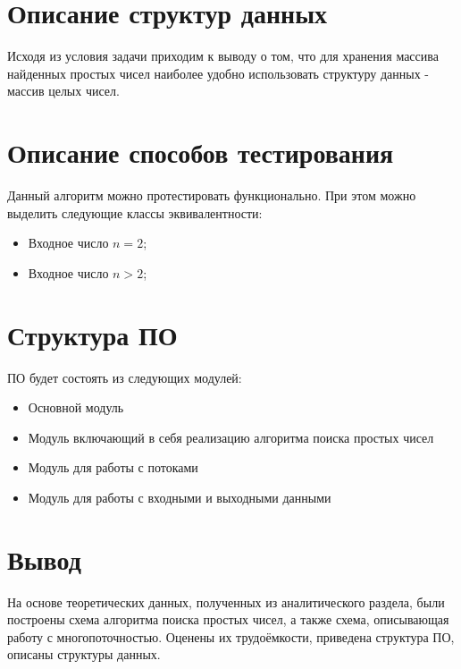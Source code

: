 \section{Описание структур данных}
Исходя из условия задачи приходим к выводу о том, что для хранения массива найденных простых чисел наиболее удобно использовать структуру данных - массив целых чисел.

\section{Описание способов тестирования}
Данный алгоритм можно протестировать функционально. При этом можно выделить следующие классы эквивалентности: 

\begin{itemize}
    \item Входное число $n = 2$;
    \item Входное число $n > 2$;
\end{itemize}


\section{Структура ПО}
ПО будет состоять из следующих модулей:

\begin{itemize}
    \item Основной модуль
    \item Модуль включающий в себя реализацию алгоритма поиска простых чисел
    \item Модуль для работы с потоками
    \item Модуль для работы с входными и выходными данными
\end{itemize}

\section*{Вывод}


На основе теоретических данных, полученных из аналитического раздела, были построены схема алгоритма поиска простых чисел, а также схема, описывающая работу с многопоточностью.  Оценены их трудоёмкости, приведена структура ПО, описаны структуры данных.